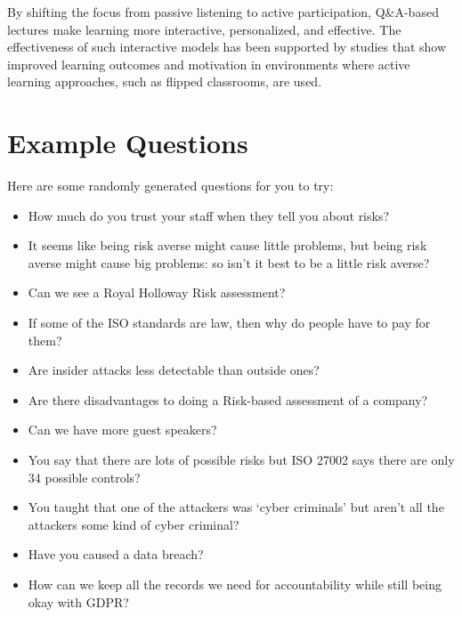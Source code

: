 \documentclass[12pt]{article}
\begin{document}
By shifting the focus from passive listening to active participation, Q\&A-based lectures make learning more interactive, personalized, and effective. The effectiveness of such interactive models has been supported by studies that show improved learning outcomes and motivation in environments where active learning approaches, such as flipped classrooms, are used.\cite{ZhengLanqin2020TEot}

\section{Example Questions} 
Here are some randomly generated questions for you to try: 

\begin{itemize}
  \item How much do you trust your staff when they tell you about risks?
  \item It seems like being risk averse might cause little problems, but being risk averse might cause big problems: so isn't it best to be a little risk averse?
  \item Can we see a Royal Holloway Risk assessment?
  \item If some of the ISO standards are law, then why do people have to pay for them?
  \item Are insider attacks less detectable than outside ones?
  \item Are there disadvantages to doing a Risk-based assessment of a company?
  \item Can we have more guest speakers?
  \item You say that there are lots of possible risks but ISO 27002 says there are only 34 possible controls?
  \item You taught that one of the attackers was `cyber criminals' but aren't all the attackers some kind of cyber criminal?
  \item Have you caused a data breach?
  \item How can we keep all the records we need for accountability while still being okay with GDPR?
\end{itemize}







\maketitle
\end{document}
